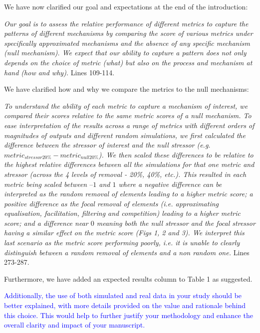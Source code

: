 \documentclass[
]{article}
\begin{document}
We have now clarified our goal and expectations at the end of the introduction:

\textit{Our goal is to assess the relative performance of different metrics to capture the patterns of different mechanisms by comparing the score of various metrics under specifically approximated mechanisms and the absence of any specific mechanism (null mechanism).
We expect that our ability to capture a pattern does not only depends on the choice of metric (what) but also on the process and mechanism at hand (how and why).}
Lines 109-114.

We have clarified how and why we compare the metrics to the null mechanisms:

\textit{To understand the ability of each metric to capture a mechanism of interest, we compared their scores relative to the same metric scores of a null mechanism.
To ease interpretation of the results across a range of metrics with different orders of magnitudes of outputs and different random simulations, we first calculated the difference between the stressor of interest and the null stressor (e.g. $metric_{stressor20\%} - metric_{null20\%}$).
We then scaled these differences to be relative to the highest relative differences between all the simulations for that one metric and stressor (across the 4 levels of removal - 20\%, 40\%, etc.).
This resulted in each metric being scaled between $–1$ and $1$ where a negative difference can be interpreted as the random removal of elements leading to a higher metric score; a positive difference as the focal removal of elements (i.e. approximating equalisation, facilitation, filtering and competition) leading to a higher metric score; and a difference near $0$ meaning both the null stressor and the focal stressor having a similar effect on the metric score (Figs 1, 2 and 3).
We interpret this last scenario as the metric score performing poorly, i.e. it is unable to clearly distinguish between a random removal of elements and a non random one.}
Lines 273-287.

Furthermore, we have added an expected results column to Table 1 as suggested.

\textcolor{blue}{Additionally, the use of both simulated and real data in your study should be better explained, with more details provided on the value and rationale behind this choice.
This would help to further justify your methodology and enhance the overall clarity and impact of your manuscript.}
\end{document}
